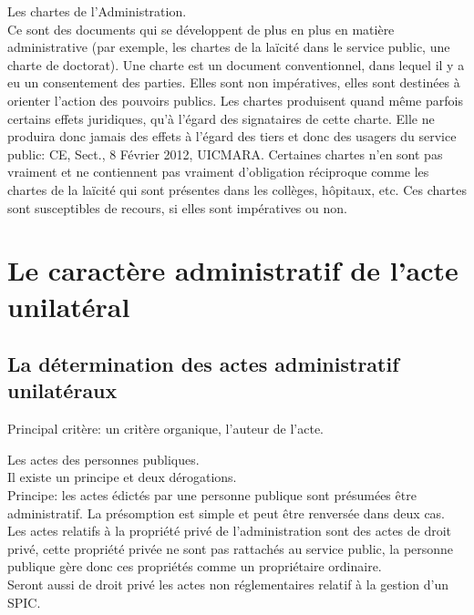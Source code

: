 \documentclass[10pt, a4paper, openany]{book}
\begin{document}
Les chartes de l'Administration. \\
Ce sont des documents qui se développent de plus en plus en matière administrative (par exemple, les chartes de la laïcité dans le service public, une charte de doctorat). Une charte est un document conventionnel, dans lequel il y a eu un consentement des parties. Elles sont non impératives, elles sont destinées à orienter l'action des pouvoirs publics. Les chartes produisent quand même parfois certains effets juridiques, qu'à l'égard des signataires de cette charte. Elle ne produira donc jamais des effets à l'égard des tiers et donc des usagers du service public: CE, Sect., 8 Février 2012, UICMARA. Certaines chartes n'en sont pas vraiment et ne contiennent pas vraiment d'obligation réciproque comme les chartes de la laïcité qui sont présentes dans les collèges, hôpitaux, etc. Ces chartes sont susceptibles de recours, si elles sont impératives ou non.

\section{Le caractère administratif de l'acte unilatéral}

\subsection{La détermination des actes administratif unilatéraux}

Principal critère: un critère organique, l'auteur de l'acte. 


Les actes des personnes publiques. \\
Il existe un principe et deux dérogations. \\
Principe: les actes édictés par une personne publique sont présumées être administratif. La présomption est simple et peut être renversée dans deux cas. Les actes relatifs à la propriété privé de l'administration sont des actes de droit privé, cette propriété privée ne sont pas rattachés au service public, la personne publique gère donc ces propriétés comme un propriétaire ordinaire. \\
Seront aussi de droit privé les actes non réglementaires relatif à la gestion d'un SPIC. 
\end{document}

